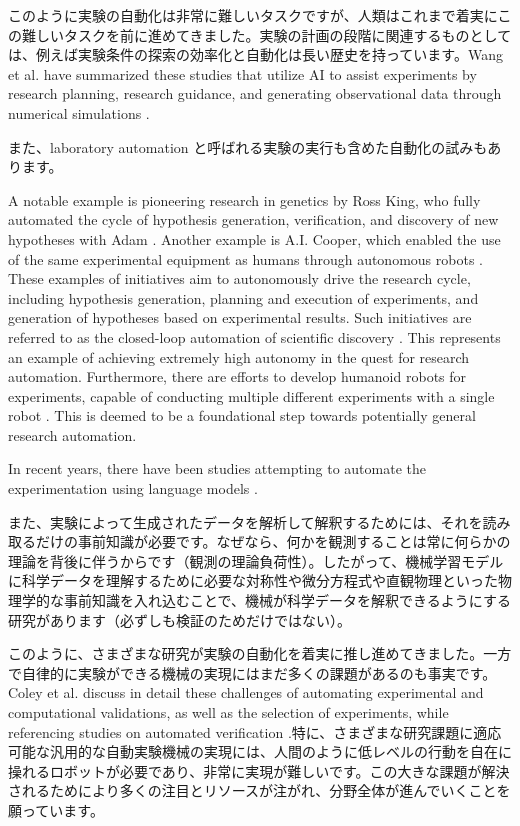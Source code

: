 このように実験の自動化は非常に難しいタスクですが、人類はこれまで着実にこの難しいタスクを前に進めてきました。実験の計画の段階に関連するものとしては、例えば実験条件の探索の効率化と自動化は長い歴史を持っています。Wang et al. have summarized these studies that utilize AI to assist experiments by research planning, research guidance, and generating observational data through numerical simulations \cite{wang2023scientific}. 

また、laboratory automation と呼ばれる実験の実行も含めた自動化の試みもあります。
 
A notable example is pioneering research in genetics by Ross King, who fully automated the cycle of hypothesis generation, verification, and discovery of new hypotheses with Adam \cite{king2004functional}. Another example is A.I. Cooper, which enabled the use of the same experimental equipment as humans through autonomous robots \cite{burger2020mobile}. These examples of initiatives aim to autonomously drive the research cycle, including hypothesis generation, planning and execution of experiments, and generation of hypotheses based on experimental results. Such initiatives are referred to as the closed-loop automation of scientific discovery     \cite{burger2020mobile,king2004functional}. This represents an example of achieving extremely high autonomy in the quest for research automation. Furthermore, there are efforts to develop humanoid robots for experiments, capable of conducting multiple different experiments with a single robot \cite{yachie2017robotic}. This is deemed to be a foundational step towards potentially general research automation. 

In recent years, there have been studies attempting to automate the experimentation using language models \cite{boiko2023emergent,charness2023generation,qin2023gpt}.

また、実験によって生成されたデータを解析して解釈するためには、それを読み取るだけの事前知識が必要です。なぜなら、何かを観測することは常に何らかの理論を背後に伴うからです（観測の理論負荷性）。したがって、機械学習モデルに科学データを理解するために必要な対称性や微分方程式や直観物理といった物理学的な事前知識を入れ込むことで、機械が科学データを解釈できるようにする研究があります（必ずしも検証のためだけではない）。

このように、さまざまな研究が実験の自動化を着実に推し進めてきました。一方で自律的に実験ができる機械の実現にはまだ多くの課題があるのも事実です。Coley et al. discuss in detail these challenges of automating experimental and computational validations, as well as the selection of experiments, while referencing studies on automated verification \cite{coley2020autonomousII}.特に、さまざまな研究課題に適応可能な汎用的な自動実験機械の実現には、人間のように低レベルの行動を自在に操れるロボットが必要であり、非常に実現が難しいです。この大きな課題が解決されるためにより多くの注目とリソースが注がれ、分野全体が進んでいくことを願っています。


